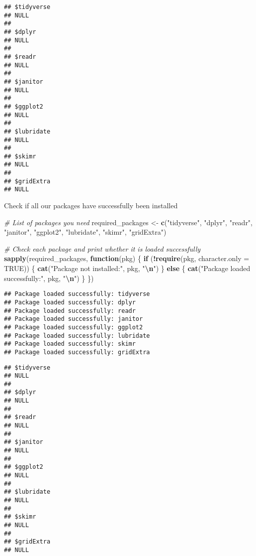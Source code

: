 \documentclass[
]{article}
\newenvironment{Shaded}{\begin{snugshade}}{\end{snugshade}}
\newcommand{\AttributeTok}[1]{\textcolor[rgb]{0.13,0.29,0.53}{#1}}
\newcommand{\CommentTok}[1]{\textcolor[rgb]{0.56,0.35,0.01}{\textit{#1}}}
\newcommand{\ConstantTok}[1]{\textcolor[rgb]{0.56,0.35,0.01}{#1}}
\newcommand{\ControlFlowTok}[1]{\textcolor[rgb]{0.13,0.29,0.53}{\textbf{#1}}}
\newcommand{\FunctionTok}[1]{\textcolor[rgb]{0.13,0.29,0.53}{\textbf{#1}}}
\newcommand{\NormalTok}[1]{#1}
\newcommand{\OtherTok}[1]{\textcolor[rgb]{0.56,0.35,0.01}{#1}}
\newcommand{\SpecialCharTok}[1]{\textcolor[rgb]{0.81,0.36,0.00}{\textbf{#1}}}
\newcommand{\StringTok}[1]{\textcolor[rgb]{0.31,0.60,0.02}{#1}}
\begin{document}
\begin{verbatim}
## $tidyverse
## NULL
## 
## $dplyr
## NULL
## 
## $readr
## NULL
## 
## $janitor
## NULL
## 
## $ggplot2
## NULL
## 
## $lubridate
## NULL
## 
## $skimr
## NULL
## 
## $gridExtra
## NULL
\end{verbatim}

Check if all our packages have successfully been installed

\begin{Shaded}
\begin{Highlighting}[]
\CommentTok{\# List of packages you need}
\NormalTok{required\_packages }\OtherTok{\textless{}{-}} \FunctionTok{c}\NormalTok{(}\StringTok{"tidyverse"}\NormalTok{, }\StringTok{"dplyr"}\NormalTok{, }\StringTok{"readr"}\NormalTok{, }\StringTok{"janitor"}\NormalTok{, }\StringTok{"ggplot2"}\NormalTok{, }\StringTok{"lubridate"}\NormalTok{, }\StringTok{"skimr"}\NormalTok{, }\StringTok{"gridExtra"}\NormalTok{)}

\CommentTok{\# Check each package and print whether it is loaded successfully}
\FunctionTok{sapply}\NormalTok{(required\_packages, }\ControlFlowTok{function}\NormalTok{(pkg) \{}
  \ControlFlowTok{if}\NormalTok{ (}\SpecialCharTok{!}\FunctionTok{require}\NormalTok{(pkg, }\AttributeTok{character.only =} \ConstantTok{TRUE}\NormalTok{)) \{}
    \FunctionTok{cat}\NormalTok{(}\StringTok{"Package not installed:"}\NormalTok{, pkg, }\StringTok{"}\SpecialCharTok{\textbackslash{}n}\StringTok{"}\NormalTok{)}
\NormalTok{  \} }\ControlFlowTok{else}\NormalTok{ \{}
    \FunctionTok{cat}\NormalTok{(}\StringTok{"Package loaded successfully:"}\NormalTok{, pkg, }\StringTok{"}\SpecialCharTok{\textbackslash{}n}\StringTok{"}\NormalTok{)}
\NormalTok{  \}}
\NormalTok{\})}
\end{Highlighting}
\end{Shaded}

\begin{verbatim}
## Package loaded successfully: tidyverse 
## Package loaded successfully: dplyr 
## Package loaded successfully: readr 
## Package loaded successfully: janitor 
## Package loaded successfully: ggplot2 
## Package loaded successfully: lubridate 
## Package loaded successfully: skimr 
## Package loaded successfully: gridExtra
\end{verbatim}

\begin{verbatim}
## $tidyverse
## NULL
## 
## $dplyr
## NULL
## 
## $readr
## NULL
## 
## $janitor
## NULL
## 
## $ggplot2
## NULL
## 
## $lubridate
## NULL
## 
## $skimr
## NULL
## 
## $gridExtra
## NULL
\end{verbatim}
\end{document}
